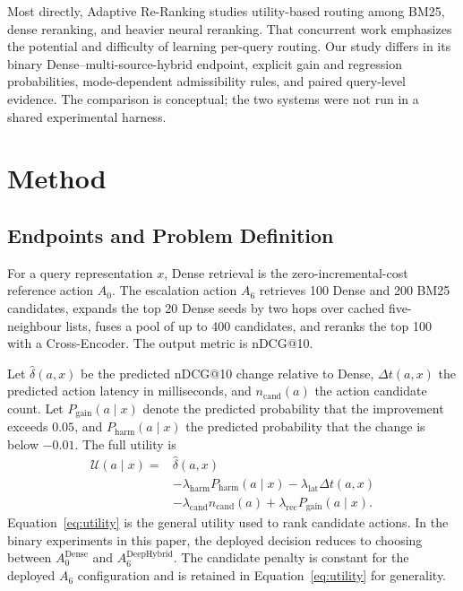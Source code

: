 \documentclass[10pt,journal]{IEEEtran}
\makeatletter
\newcommand{\ndcg}{nDCG@10}
\newcommand{\pgain}{P_{\mathrm{gain}}}
\newcommand{\pharm}{P_{\mathrm{harm}}}
\makeatother
\begin{document}
Most directly, Adaptive Re-Ranking \cite{genc2026adaptive} studies utility-based routing among BM25, dense reranking, and heavier neural reranking. That concurrent work emphasizes the potential and difficulty of learning per-query routing. Our study differs in its binary Dense--multi-source-hybrid endpoint, explicit gain and regression probabilities, mode-dependent admissibility rules, and paired query-level evidence. The comparison is conceptual; the two systems were not run in a shared experimental harness.

\section{Method}
\label{sec:method}

\subsection{Endpoints and Problem Definition}

For a query representation $x$, Dense retrieval is the zero-incremental-cost reference action $A_0$. The escalation action $A_6$ retrieves 100 Dense and 200 BM25 candidates, expands the top 20 Dense seeds by two hops over cached five-neighbour lists, fuses a pool of up to 400 candidates, and reranks the top 100 with a Cross-Encoder. The output metric is \ndcg{}.

Let $\hat{\delta}(a,x)$ be the predicted \ndcg{} change relative to Dense, $\Delta t(a,x)$ the predicted action latency in milliseconds, and $n_{\mathrm{cand}}(a)$ the action candidate count. Let $\pgain(a\mid x)$ denote the predicted probability that the improvement exceeds $0.05$, and $\pharm(a\mid x)$ the predicted probability that the change is below $-0.01$. The full utility is
\begin{equation}
\begin{split}
\mathcal{U}(a\mid x)={}&\hat{\delta}(a,x)\\
&-\lambda_{\mathrm{harm}}\pharm(a\mid x)
-\lambda_{\mathrm{lat}}\Delta t(a,x)\\
&-\lambda_{\mathrm{cand}}n_{\mathrm{cand}}(a)
+\lambda_{\mathrm{rec}}\pgain(a\mid x).
\end{split}
\label{eq:utility}
\end{equation}
Equation~\eqref{eq:utility} is the general utility used to rank candidate actions. In the binary experiments in this paper, the deployed decision reduces to choosing between $A_0^{\mathrm{Dense}}$ and $A_6^{\mathrm{DeepHybrid}}$. The candidate penalty is constant for the deployed $A_6$ configuration and is retained in Equation~\eqref{eq:utility} for generality.
\end{document}
